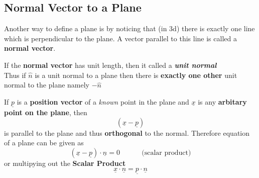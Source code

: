 \subsection{Normal Vector to a Plane}
Another way to define a plane is by noticing that (in 3d) there is exactly one line which is perpendicular to the plane. A vector parallel to this line is called a {\bf normal vector}.

\begin{note}
	If the {\bf normal vector} has unit length, then it called a {\bf \em unit normal} \\
	Thus if $\hat{n}$ is a unit normal to a plane then there is {\bf exactly one other} unit normal to the plane namely $-\hat{n}$
\end{note}

\begin{definition}
	If $\underline{p}$ is a {\bf position vector} of a {\em known} point in the plane and $\underline{x}$ is any {\bf arbitary point on the plane}, then
	$$( \underline{x} - \underline{p} ) $$
	is parallel to the plane and thus {\bf orthogonal} to the normal. Therefore equation of a plane can be given as
	\begin{equation}
		\label{eq: normal-vector-plane-eq}
		(\underline{x} - \underline{p})\cdot\underline{n} = 0 \ \ \ \ \ \ \ \ \ \ \ \ \ \  \text{(scalar product)}
	\end{equation}
	or multipying out the {\bf Scalar Product}
	$$\underline{x} \cdot \underline{n} = \underline{p} \cdot \underline{n}$$
\end{definition}
